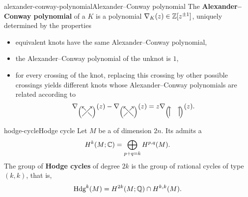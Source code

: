 \begin{topic}{alexander-conway-polynomial}{Alexander--Conway polynomial}
    The \textbf{Alexander--Conway polynomial} of a  $K$ is a polynomial $\nabla_K(z) \in \mathbb{Z}[z^{\pm 1}]$, uniquely determined by the properties
    \begin{itemize}
        \item equivalent knots have the same Alexander--Conway polynomial,
        \item the Alexander--Conway polynomial of the unknot is $1$,
        \item for every crossing of the knot, replacing this crossing by other possible crossings yields different knots whose Alexander--Conway polynomials are related according to
        \[ \nabla_{\left( \begin{tikzpicture}[semithick, scale=0.5, baseline=1ex] 
            \draw [-to] (0, 0) -- (1, 1);
            \draw (1, 0) -- (0.6, 0.4);
            \draw [-to] (0.4, 0.6) -- (0, 1);
        \end{tikzpicture} \right)}(z) - \nabla_{\left( \begin{tikzpicture}[semithick, scale=0.5, baseline=1ex]
            \draw (0, 0) -- (0.4, 0.4);
            \draw [-to] (0.6, 0.6) -- (1, 1);
            \draw [-to] (1, 0) -- (0, 1);
        \end{tikzpicture} \right)}(z) = z \nabla_{\left( \begin{tikzpicture}[semithick, scale=0.5, baseline=1ex]
            \draw [-to] (0, 0) -- (0, 1);
            \draw [-to] (1, 0) -- (1, 1);
        \end{tikzpicture} \right)}(z) . \]
    \end{itemize}
\end{topic}

\begin{topic}{hodge-cycle}{Hodge cycle}
    Let $M$ be a   of dimension $2n$.  Its  admits a 
    \[ H^k(M; \mathbb{C}) = \bigoplus_{p + q = k} H^{p, q}(M) . \]
    The group of \textbf{Hodge cycles} of degree $2k$ is the group of rational cycles of type $(k, k)$, that is,
    \[ \textup{Hdg}^k(M) = H^{2k}(M; \mathbb{Q}) \cap H^{k, k}(M) . \]
\end{topic}
